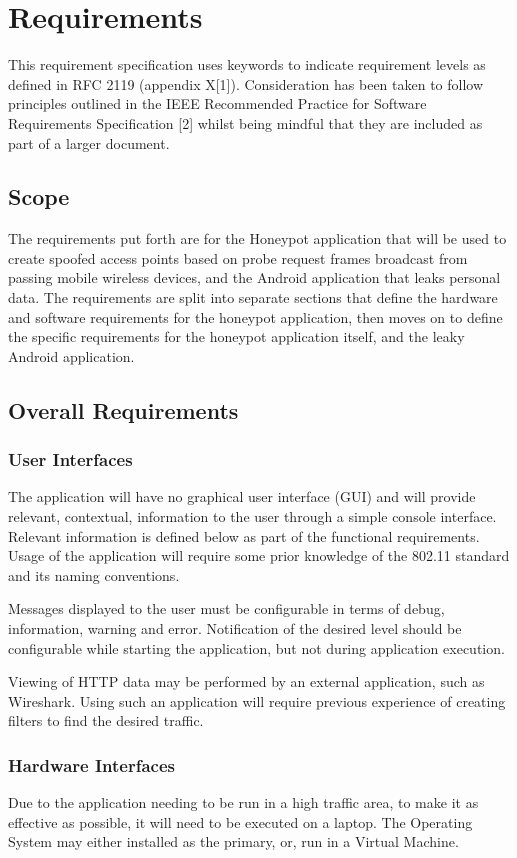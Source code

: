 \section{Requirements}
This requirement specification uses keywords to indicate requirement levels as defined in RFC 2119 (appendix X[1]). Consideration has been taken to follow principles outlined in the IEEE Recommended Practice for Software Requirements Specification [2] whilst being mindful that they are included as part of a larger document.

\subsection{Scope}
The requirements put forth are for the Honeypot application that will be used to create spoofed access points based on probe request frames broadcast from passing mobile wireless devices, and the Android application that leaks personal data. The requirements are split into separate sections that define the hardware and software requirements for the honeypot application, then moves on to define the specific requirements for the honeypot application itself, and the leaky Android application.

\subsection{Overall Requirements}
\subsubsection{User Interfaces}
The application will have no graphical user interface (GUI) and will provide relevant, contextual, information to the user through a simple console interface. Relevant information is defined below as part of the functional requirements. Usage of the application will require some prior knowledge of the 802.11 standard and its naming conventions.

Messages displayed to the user must be configurable in terms of debug, information, warning and error. Notification of the desired level should be configurable while starting the application, but not during application execution.

Viewing of HTTP data may be performed by an external application, such as Wireshark. Using such an application will require previous experience of creating filters to find the desired traffic.

\subsubsection{Hardware Interfaces}
Due to the application needing to be run in a high traffic area, to make it as effective as possible, it will need to be executed on a laptop. The Operating System may either installed as the primary, or, run in a Virtual Machine.


